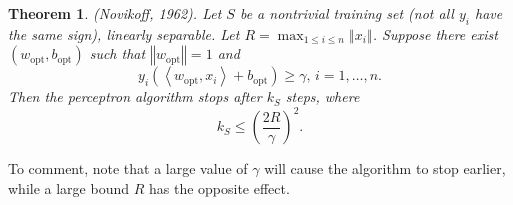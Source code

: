 \documentclass[11pt,twoside]{article}%
\theoremstyle{change}
\newtheorem{theorem}{Theorem}[section]
\begin{document}
\pagebreak

\begin{theorem}
(Novikoff, 1962). Let $S$ be a nontrivial training set (not all $y_{i}$ have
the same sign), linearly separable. Let $R=\max_{1\leq i\leq n}\left\Vert
x_{i}\right\Vert $. Suppose there exist $(w_{\mathrm{opt}},b_{\mathrm{opt}})$
such that $\left\Vert w_{\mathrm{opt}}\right\Vert =1$ and
\[
y_{i}\left(  \left\langle w_{\mathrm{opt}},x_{i}\right\rangle +b_{\mathrm{opt}%
}\right)  \geq\gamma\text{, }i=1,\ldots,n.
\]
Then the perceptron algorithm stops after $k_{S}$ steps, where
\[
k_{S}\leq\left(  \frac{2R}{\gamma}\right)  ^{2}.
\]

\end{theorem}

To comment, note that a large value of $\gamma$ will cause the algorithm to
stop earlier, while a large bound $R$ has the opposite effect.
\end{document}
